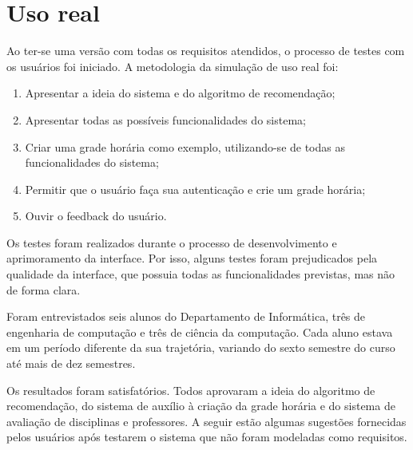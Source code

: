 \chapter{Uso real}
\label{cha:Uso real}

Ao ter-se uma versão com todas os requisitos atendidos, o processo de testes com os usuários foi iniciado. A metodologia da simulação de uso real foi:

\begin{enumerate}
    \item Apresentar a ideia do sistema e do algoritmo de recomendação;
    \item Apresentar todas as possíveis funcionalidades do sistema;
    \item Criar uma grade horária como exemplo, utilizando-se de todas as funcionalidades do sistema;
    \item Permitir que o usuário faça sua autenticação e crie um grade horária;
    \item Ouvir o feedback do usuário.
\end{enumerate}

Os testes foram realizados durante o processo de desenvolvimento e aprimoramento da interface. Por isso, alguns testes foram prejudicados pela qualidade da interface, que possuia todas as funcionalidades previstas, mas não de forma clara.

Foram entrevistados seis alunos do Departamento de Informática, três de engenharia de computação e três de ciência da computação. Cada aluno estava em um período diferente da sua trajetória, variando do sexto semestre do curso até mais de dez semestres.

Os resultados foram satisfatórios. Todos aprovaram a ideia do algoritmo de recomendação, do sistema de auxílio à criação da grade horária e do sistema de avaliação de disciplinas e professores. A seguir estão algumas sugestões fornecidas pelos usuários após testarem o sistema que não foram modeladas como requisitos.

